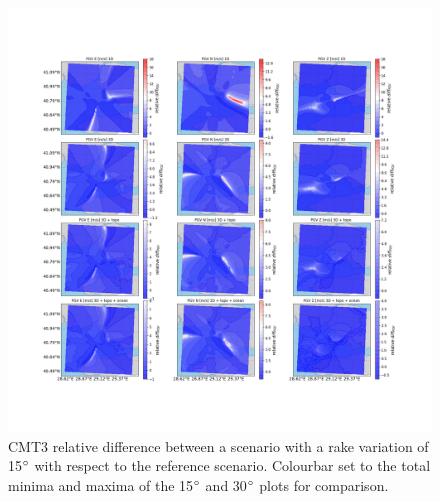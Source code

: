 \documentclass[../Text/00main.tex]{subfiles}
\begin{document}
\begin{figure}[!h]
    \centering
    \includegraphics[width=1\linewidth,trim = 2cm 5cm 1cm 5cm, clip]{images_results/rake_variation_epsilon12_sc2.png}
    \caption{CMT3 relative difference between a scenario with a rake variation of 15$\degree$ with respect to the reference scenario. Colourbar set to the total minima and maxima of the 15$\degree$ and 30$\degree$ plots for comparison.}
    \label{fig:ref_eps12-2}
\end{figure}
\end{document}
